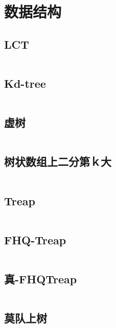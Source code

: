 \chapter{数据结构}
\section{LCT}
\inputminted{cpp}{\source/data-structure/LCT.cpp}
\section{Kd-tree}
\inputminted{cpp}{\source/data-structure/Kd-tree.cpp}
\section{虚树}
\inputminted{cpp}{\source/data-structure/virtual-tree.cpp}
\section{树状数组上二分第ｋ大}
\inputminted{cpp}{\source/data-structure/fenwicktree_kth.cpp}
\section{Treap}
\inputminted{cpp}{\source/data-structure/Treap.cpp}
\section{FHQ-Treap}
\inputminted{cpp}{\source/data-structure/fhqTreap.cpp}
\section{真-FHQTreap}
\inputminted{cpp}{\source/data-structure/true.fhqtreap.cpp}
\section{莫队上树}
\inputminted{cpp}{\source/data-structure/mo-team-on-tree.cpp}